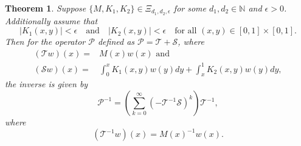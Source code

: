 \documentclass[9pt,journal,twocolumn]{IEEEtran}
\newtheorem{theorem}{Theorem}
\newcommand{\igzx}{\int_0^x}
\newcommand{\igxo}{\int_x^1}
\begin{document}
\begin{theorem}\label{thm:inv_op}
Suppose $\{M,K_1,K_2\} \in \Xi_{d_1,d_2,\epsilon}$ for some $d_1,d_2 \in \mathbb{N}$ and $\epsilon >0$. Additionally assume that
\[ |K_1(x,y)| < \epsilon \quad \text{and}\quad  |K_2(x,y)| < \epsilon\quad \text{for all } (x,y) \in [0,1] \times [0,1].\] Then for the operator $\mathcal{P}$ defined as $\mathcal{P}=\mathcal{T}+\mathcal{S}$, where
\begin{align*}
(\mathcal{T}w)(x)=&M(x)w(x)\text{ and } \\
(\mathcal{S}w)(x)=&\igzx K_1(x,y)w(y)dy+\igxo K_2(x,y)w(y)dy,
\end{align*} the inverse is given by
\[\mathcal{P}^{-1}=\left( \sum_{k=0}^\infty(-\mathcal{T}^{-1}\mathcal{S})^k  \right)\mathcal{T}^{-1},\] where
\[(\mathcal{T}^{-1}w)(x)=M(x)^{-1}w(x).\]
\end{theorem}
\end{document}
